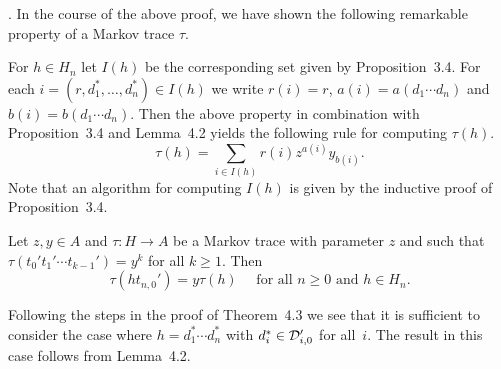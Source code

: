 . In the course of the above proof, we have shown the following remarkable
property of a Markov trace $\tau$.

\medskip
{}
\medskip

For $h \in H_n$ let $I(h)$ be the corresponding set given by
Proposition~3.4. For each $i=(r,d_1^{*},\ldots,d_n^{*}) \in I(h)$ we
write $r(i)=r$, $a(i)=a(d_1 \cdots d_n)$ and $b(i)=b(d_1 \cdots d_n)$. Then
the above property in combination with Proposition~3.4 and Lemma~4.2 yields 
the following rule for computing $\tau(h)$.
\[ \tau(h)=\sum_{i \in I(h)} r(i) z^{a(i)}y_{b(i)}.\]
Note that an algorithm for computing $I(h)$ is given by the inductive
proof of Proposition~3.4.

\addtocounter{thm}{1}
\begin{prop}
Let $z,y \in A$ and $\tau:H \rightarrow A$ be a Markov trace with
parameter $z$ and such that $\tau(t_0't_1' \cdots t_{k-1}')=y^{k}$ 
for all $k \geq 1$. Then \[ \tau(ht_{n,0}')=y\tau(h) \quad 
\mbox{ for all $n \geq 0$ and $h \in H_n$}.\]
\end{prop}

\begin{pf} Following the steps in the proof of Theorem~4.3 we see that
it is sufficient to consider the case where $h=d_1^{*} \cdots d_n^{*}$
with $d_i^{*} \in {\cal D}_{i,0}'$ for all~$i$. The result in this
case follows from Lemma~4.2. \end{pf}

